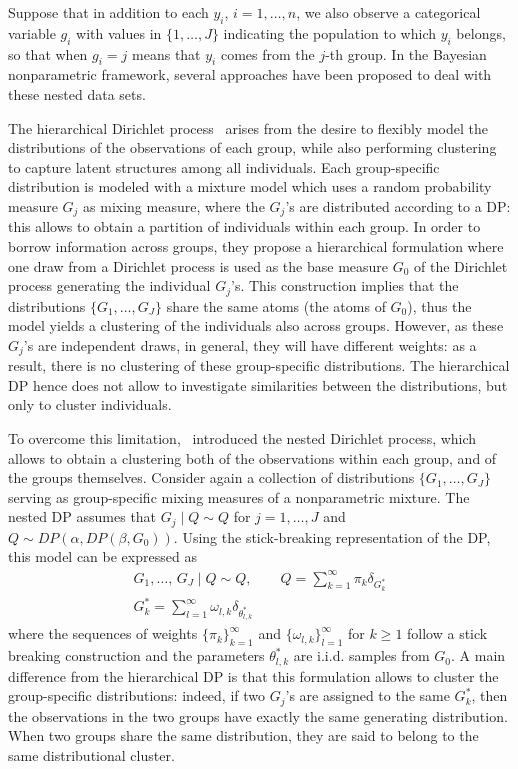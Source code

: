 Suppose that in addition to each $y_i$, $i=1,\dots,n$, we also observe a categorical variable $g_i$ with values in $\{1,\dots,J\}$ indicating the population to which $y_i$ belongs, so that when $g_i = j$ means that $y_i$ comes from the $j$-th group.
In the Bayesian nonparametric framework, several approaches have been proposed to deal with these nested data sets.

The hierarchical Dirichlet process~\citep{Teh2006} arises from the desire to flexibly model the distributions of the observations of each group, while also performing clustering to capture latent structures among all individuals.
Each group-specific distribution is modeled with a mixture model which uses a random probability measure $G_j$ as mixing measure, where the $G_j$'s are distributed according to a DP: this allows to obtain a partition of individuals within each group.
In order to borrow information across groups, they propose a hierarchical formulation where one draw from a Dirichlet process is used as the base measure $G_0$ of the Dirichlet process generating the individual $G_j$'s.
This construction implies that the distributions $\{G_1,\dots,G_J\}$ share the same atoms (the atoms of $G_0$), thus the model yields a clustering of the individuals also across groups.
However, as these $G_j$'s are independent draws, in general, they will have different weights: as a result, there is no clustering of these group-specific distributions. The hierarchical DP hence does not allow to investigate similarities between the distributions, but only to cluster individuals.

To overcome this limitation,~\citet{rodriguez2008} introduced the nested Dirichlet process, which allows to obtain a clustering both of the observations within each group, and of the groups themselves. 
Consider again a collection of distributions $\{G_1,\dots,G_J\}$ serving as group-specific mixing measures of a nonparametric mixture. The nested DP assumes that $G_j\mid Q \sim Q$ for $j=1,\dots,J$ and $Q \sim DP(\alpha, DP(\beta,G_0))$. Using the stick-breaking representation of the DP, this model can be expressed as
\begin{gather}
G_1,\dots,\,G_J \mid Q \sim Q, \qquad Q = \sum_{k=1}^{\infty} \pi_k \delta_{G^*_k} \label{eq:ch1_nestedDP_level1}\\
G^*_k = \sum_{l=1}^{\infty} \omega_{l,k} \delta_{\theta^*_{l,k}} \nonumber
\end{gather}
where the sequences of weights $\{\pi_k\}_{k=1}^{\infty}$ and $\{\omega_{l,k}\}_{l=1}^{\infty}$ for $k\geq1$ follow a stick breaking construction and the parameters $\theta^*_{l,k}$ are i.i.d. samples from $G_0$.
A main difference from the hierarchical DP is that this formulation allows to cluster the group-specific distributions: indeed, if two $G_j$'s are assigned to the same $G^*_k$, then the observations in the two groups have exactly the same generating distribution. When two groups share the same distribution, they are said to belong to the same distributional cluster.

